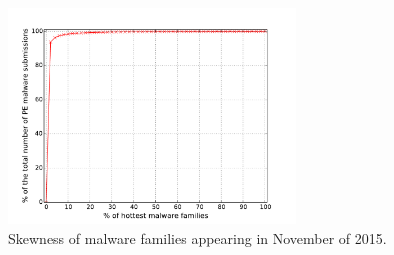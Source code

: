 \begin{figure}[t!]
\begin{center}
\includegraphics[width=3.0in]{figure/cum}
\caption{Skewness of malware families appearing in November of 2015.}
\label{fig:acum}
\end{center}
\end{figure}
